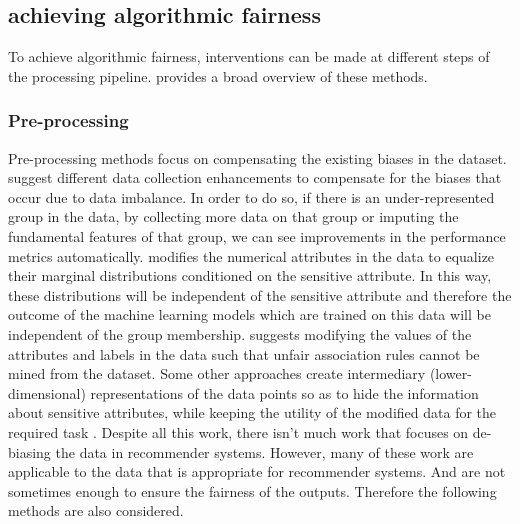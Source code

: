 
\subsection{achieving algorithmic fairness}
To achieve algorithmic fairness, interventions can be made at different steps of the processing pipeline. \cite{Friedler2019} provides a broad overview of these methods.

\subsubsection{Pre-processing}
Pre-processing methods focus on compensating the existing biases in the dataset. \cite{chen2018why} suggest different data collection enhancements to compensate for the biases that occur due to data imbalance. In order to do so, if there is an under-represented group in the data, by collecting more data on that group or imputing the fundamental features of that group, we can see improvements in the performance metrics automatically. \cite{Feldman2015} modifies the numerical attributes in the data to equalize their marginal distributions conditioned on the sensitive attribute. In this way, these distributions will be independent of the sensitive attribute and therefore the outcome of the machine learning models which are trained on this data will be independent of the group membership. \cite{hajian2012methodology} suggests modifying the values of the attributes and labels in the data such that unfair association rules cannot be mined from the dataset. Some other approaches create intermediary (lower-dimensional) representations of the data points so as to hide the information about sensitive attributes, while keeping the utility
of the modified data for the required task \cite{zemel2013learning,lahoti2019ifair}. 
Despite all this work, there isn't much work that focuses on de-biasing the data in recommender systems. However, many of these work are applicable to the data that is appropriate for recommender systems. And are not sometimes enough to ensure the fairness of the outputs. Therefore the following methods are also considered.

